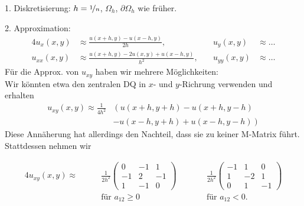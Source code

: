 \documentclass{cheat-sheet}
\newcommand{\bOmega}{\partial \Omega} %
\begin{document}
\begin{verf}
  1. Diskretisierung: $h = \nicefrac{1}{n}$, $\Omega_h$, $\bOmega_h$ wie früher.

  2. Approximation:
  \begin{alignat*}{4}
    u_x(x, y) & \approx \tfrac{u(x + h, y) - u(x - h, y)}{2h}, \quad
    & u_y(x, y) & \approx \ldots \\
    u_{xx}(x, y) & \approx \tfrac{u(x + h, y) - 2 u(x, y) + u(x - h, y)}{h^2}, \quad
    & u_{yy}(x, y) & \approx \ldots
  \end{alignat*}
  Für die Approx. von $u_{xy}$ haben wir mehrere Möglichkeiten: \\ Wir könnten etwa den zentralen DQ in $x$- und $y$-Richrung verwenden und erhalten
  \begin{align*}
    u_{xy}(x, y) \approx \tfrac{1}{4 h^2} & \left( u(x{+}h, y{+}h) - u(x{+}h, y{-}h) \right. \\
    & \left. - u(x{-}h, y{+}h) + u(x{-}h, y{-}h) \right)
  \end{align*}
  Diese Annäherung hat allerdings den Nachteil, dass sie zu keiner M-Matrix führt.
  Stattdessen nehmen wir
  \iffalse
  \begin{align*}
    u_{xy}(x, y) & \approx \tfrac{1}{2 h^2} (- u(x-h, y) + 2 u(x,y) - u(x+h,y) \\
    & + u(x-h,y-h) - u(x, y+h) - u(x,y-h) \\
    & + u(x+h, y+h) ) \qquad \text{falls $a_{12}(x, y) \geq 0$,} \\
    u_{xy}(x, y) & \approx \tfrac{1}{2 h^2} ( u(x-h, y) - 2 u(x, y) + u(x+h, y) \\
    & + u(x, y+h) - u(x-h, y+h) - u(x+h, y-h) \\
    & + u(x,y-h) ) \qquad \text{falls $a_{12}(x, y) < 0$}
  \end{align*}
  \fi
  \begin{alignat*}{4}
    u_{xy}(x, y) \approx \qquad
    & \tfrac{1}{2 h^2} \begin{pmatrix}
      0 & -1 & 1 \\
      -1 & 2 & -1 \\
      1 & -1 & 0
    \end{pmatrix} \qquad
    && \tfrac{1}{2 h^2} \begin{pmatrix}
      -1 & 1 & 0 \\
      1 & -2 & 1 \\
      0 & 1 & -1
    \end{pmatrix} \\
    & \text{für } a_{12} \geq 0
    && \text{für } a_{12} < 0.
  \end{alignat*}


\end{verf}
\end{document}
